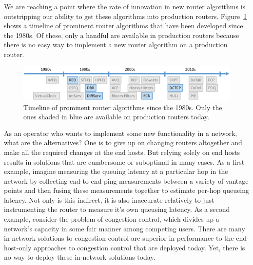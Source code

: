 We are reaching a point where the rate of innovation in new router algorithms
is outstripping our ability to get these algorithms into production routers.
Figure~\ref{fig:router_algos} shows a timeline of prominent router algorithms
that have been developed since the 1980s. Of these, only a handful are
available in production routers because there is no easy way to implement a new
router algorithm on a production router.

\begin{figure}
\centering
\includegraphics[width=\columnwidth]{router_alg_timeline.pdf}
\caption{Timeline of prominent router algorithms since the 1980s. Only the ones shaded in blue are available on production routers today.}
\label{fig:router_algos}
\end{figure}

As an operator who wants to implement some new functionality in a network, what
are the alternatives? One is to give up on changing routers altogether and make
all the required changes at the end hosts. But relying solely on end hosts
results in solutions that are cumbersome or suboptimal in many cases. As a
first example, imagine measuring the queuing latency at a particular hop in the
network by collecting end-to-end ping measurements between a variety of vantage
points and then fusing these measurements together to estimate per-hop queueing
latency. Not only is this indirect, it is also inaccurate relatively to just
instrumenting the router to measure it's own queueing latency. As a second
example, consider the problem of congestion control, which divides up a
network's capacity in some fair manner among competing users. There are many
in-network solutions to congestion control are superior in performance to the
end-host-only approaches to congestion control that are deployed today. Yet,
there is no way to deploy these in-network solutions today.

